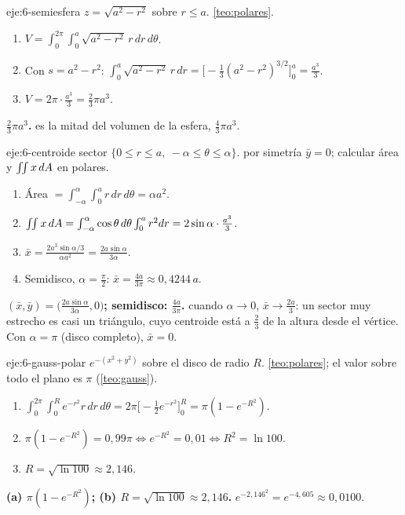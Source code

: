 \begin{solucion}{eje:6-semiesfera}
\datos $z=\sqrt{a^2-r^2}$ sobre $r\le a$.
\planteamiento \cref{teo:polares}.
\pasos
\begin{enumerate}[label=\arabic*.]
  \item $V=\int_0^{2\pi}\int_0^a\sqrt{a^2-r^2}\,r\,dr\,d\theta$.
  \item Con $s=a^2-r^2$: $\int_0^a\sqrt{a^2-r^2}\,r\,dr=\bigl[-\frac13(a^2-r^2)^{3/2}\bigr]_0^a=\frac{a^3}{3}$.
  \item $V=2\pi\cdot\frac{a^3}3=\frac23\pi a^3$.
\end{enumerate}
\resultado \textbf{$\frac23\pi a^3$.}
\comprobacion es la mitad del volumen de la esfera, $\frac43\pi a^3$.
\end{solucion}

\begin{solucion}{eje:6-centroide}
\datos sector $\{0\le r\le a,\ -\alpha\le\theta\le\alpha\}$.
\planteamiento por simetría $\bar y=0$; calcular área y $\iint x\,dA$ en polares.
\pasos
\begin{enumerate}[label=\arabic*.]
  \item Área $=\int_{-\alpha}^{\alpha}\int_0^ar\,dr\,d\theta=\alpha a^2$.
  \item $\iint x\,dA=\int_{-\alpha}^{\alpha}\cos\theta\,d\theta\int_0^ar^2dr=2\sin\alpha\cdot\frac{a^3}3$.
  \item $\bar x=\frac{2a^3\sin\alpha/3}{\alpha a^2}=\frac{2a\sin\alpha}{3\alpha}$.
  \item Semidisco, $\alpha=\frac\pi2$: $\bar x=\frac{4a}{3\pi}\approx0{,}4244\,a$.
\end{enumerate}
\resultado \textbf{$(\bar x,\bar y)=\bigl(\frac{2a\sin\alpha}{3\alpha},0\bigr)$; semidisco: $\frac{4a}{3\pi}$.}
\comprobacion cuando $\alpha\to0$, $\bar x\to\frac{2a}{3}$: un sector muy estrecho es casi un triángulo, cuyo centroide está a $\frac23$ de la altura desde el vértice. Con $\alpha=\pi$ (disco completo), $\bar x=0$.
\end{solucion}

\begin{solucion}{eje:6-gauss-polar}
\datos $e^{-(x^2+y^2)}$ sobre el disco de radio $R$.
\planteamiento \cref{teo:polares}; el valor sobre todo el plano es $\pi$ (\cref{teo:gauss}).
\pasos
\begin{enumerate}[label=\arabic*.]
  \item $\int_0^{2\pi}\int_0^Re^{-r^2}r\,dr\,d\theta=2\pi\bigl[-\frac12e^{-r^2}\bigr]_0^R=\pi(1-e^{-R^2})$.
  \item $\pi(1-e^{-R^2})=0{,}99\pi\iff e^{-R^2}=0{,}01\iff R^2=\ln100$.
  \item $R=\sqrt{\ln100}\approx2{,}146$.
\end{enumerate}
\resultado \textbf{(a) $\pi(1-e^{-R^2})$; (b) $R=\sqrt{\ln100}\approx2{,}146$.}
\comprobacion $e^{-2{,}146^2}=e^{-4{,}605}\approx0{,}0100$.
\end{solucion}

